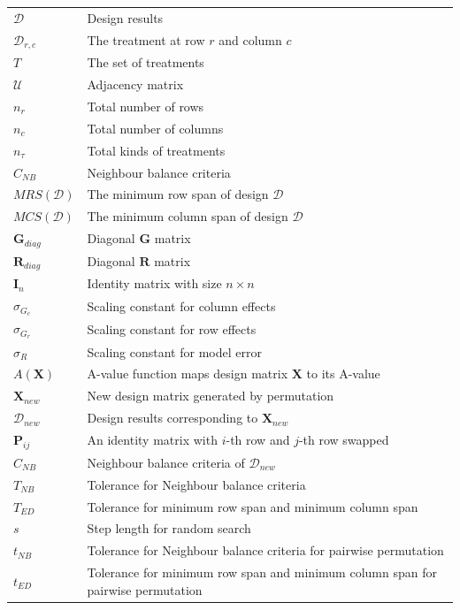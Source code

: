 \documentclass[
  a4paper,
  oneside,
  openany,
  12pt,
  onecolumn]{book}
\theoremstyle{definition}
\theoremstyle{definition}
\theoremstyle{plain}
\theoremstyle{remark}
\begin{document}
\begin{longtable}[]{@{}
  >{\raggedright\arraybackslash}p{}
  >{\raggedright\arraybackslash}p{}@{}}
\(\mathcal{D}\) & Design results \\
\(\mathcal{D}_{r,c}\) & The treatment at row \(r\) and column \(c\) \\
\(T\) & The set of treatments \\
\(\mathcal{U}\) & Adjacency matrix \\
\(n_r\) & Total number of rows \\
\(n_c\) & Total number of columns \\
\(n_{\tau}\) & Total kinds of treatments \\
\(C_{NB}\) & Neighbour balance criteria \\
\(MRS(\mathcal{D})\) & The minimum row span of design \(\mathcal{D}\) \\
\(MCS(\mathcal{D})\) & The minimum column span of design
\(\mathcal{D}\) \\
\(\boldsymbol{G}_{diag}\) & Diagonal \(\boldsymbol{G}\) matrix \\
\(\boldsymbol{R}_{diag}\) & Diagonal \(\boldsymbol{R}\) matrix \\
\(\boldsymbol{I}_n\) & Identity matrix with size \(n\times n\) \\
\(\sigma_{G_c}\) & Scaling constant for column effects \\
\(\sigma_{G_r}\) & Scaling constant for row effects \\
\(\sigma_{R}\) & Scaling constant for model error \\
\(A(\boldsymbol{X})\) & A-value function maps design matrix
\(\boldsymbol{X}\) to its A-value \\
\(\boldsymbol{X}_{new}\) & New design matrix generated by permutation \\
\(\mathcal{D}_{new}\) & Design results corresponding to
\(\boldsymbol{X}_{new}\) \\
\(\boldsymbol{P}_{ij}\) & An identity matrix with \(i\)-th row and
\(j\)-th row swapped \\
\(C_{NB}\) & Neighbour balance criteria of \(\mathcal{D}_{new}\) \\
\(T_{NB}\) & Tolerance for Neighbour balance criteria \\
\(T_{ED}\) & Tolerance for minimum row span and minimum column span \\
\(s\) & Step length for random search \\
\(t_{NB}\) & Tolerance for Neighbour balance criteria for pairwise
permutation \\
\(t_{ED}\) & Tolerance for minimum row span and minimum column span for
pairwise permutation \\

\end{longtable}
\end{document}
